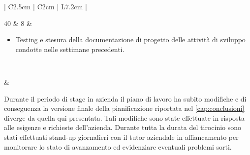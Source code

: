 \begin{center}
\begin{longtable}{| C{2.5cm} | C{2cm} | L{7.2cm} |}
			\hline
			
			40 & 8 &
			\begin{itemize}[leftmargin=*]
				\item Testing e stesura della documentazione di progetto delle attività di sviluppo condotte nelle settimane precedenti.
			\end{itemize} \\
			
			\hline
			
			 & 	\\
			
			\hline
		
			
			\caption{Pianificazione delle attività}
		\end{longtable}
		
	
\end{center}
Durante il periodo di stage in azienda il piano di lavoro ha subito modifiche e di conseguenza la versione finale della pianificazione riportata nel \autoref{cap:conclusioni} diverge da quella qui presentata. Tali modifiche sono state effettuate in risposta alle esigenze e richieste dell'azienda. 
Durante tutta la durata del tirocinio sono stati effettuati stand-up giornalieri con il tutor aziendale in affiancamento per 
monitorare lo stato di avanzamento ed evidenziare eventuali problemi sorti.
